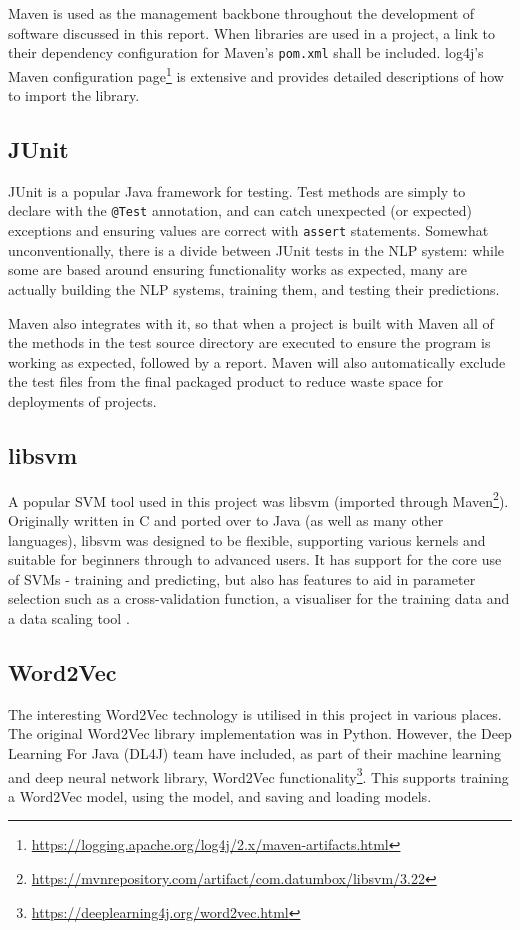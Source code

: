 Maven is used as the management backbone throughout the development of software discussed in this report. When libraries are used in a project, a link to their dependency configuration for Maven's \texttt{pom.xml} shall be included. log4j's Maven configuration page\footnote{\href{https://logging.apache.org/log4j/2.x/maven-artifacts.html}{https://logging.apache.org/log4j/2.x/maven-artifacts.html}} is extensive and provides detailed descriptions of how to import the library.

\subsection*{JUnit}
JUnit is a popular Java framework for testing. Test methods are simply to declare with the \texttt{@Test} annotation, and can catch unexpected (or expected) exceptions and ensuring values are correct with \texttt{assert} statements. Somewhat unconventionally, there is a divide between JUnit tests in the NLP system: while some are based around ensuring functionality works as expected, many are actually building the NLP systems, training them, and testing their predictions.

Maven also integrates with it, so that when a project is built with Maven all of the methods in the test source directory are executed to ensure the program is working as expected, followed by a report. Maven will also automatically exclude the test files from the final packaged product to reduce waste space for deployments of projects. 

\subsection*{libsvm}
A popular SVM tool used in this project was libsvm (imported through Maven\footnote{\href{https://mvnrepository.com/artifact/com.datumbox/libsvm/3.22}{https://mvnrepository.com/artifact/com.datumbox/libsvm/3.22}}). Originally written in C and ported over to Java (as well as many other languages), libsvm was designed to be flexible, supporting various kernels and suitable for beginners through to advanced users. It has support for the core use of SVMs - training and predicting, but also has features to aid in parameter selection such as a cross-validation function, a visualiser for the training data and a data scaling tool \cite{ChangChih-ChungandLin2011}.

\subsection*{Word2Vec}
The interesting Word2Vec technology is utilised in this project in various places. The original Word2Vec library implementation was in Python. However, the Deep Learning For Java (DL4J) team have included, as part of their machine learning and deep neural network library, Word2Vec functionality\footnote{\href{https://deeplearning4j.org/word2vec.html}{https://deeplearning4j.org/word2vec.html}}. This supports training a Word2Vec model, using the model, and saving and loading models. 

